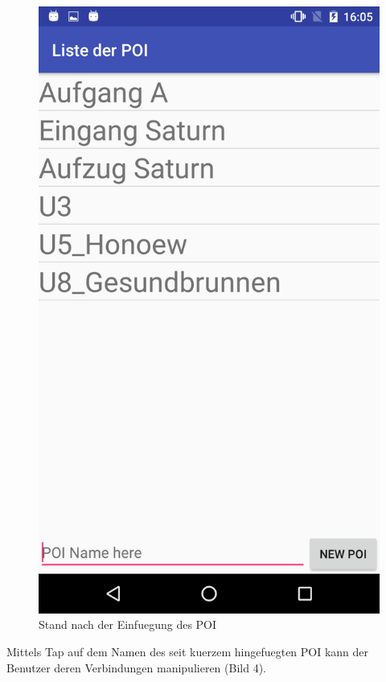 \documentclass{article}
\begin{document}
\begin{figure}[H]
	\centering
	\includegraphics[scale=0.18]{images/poi_after_insertion.png}
	\caption{Stand nach der Einfuegung des POI}
	\label{fig:poi_after_insertion}
\end{figure}

Mittels Tap auf dem Namen des seit kuerzem hingefuegten POI kann der Benutzer deren Verbindungen manipulieren (Bild 4).
\end{document}
